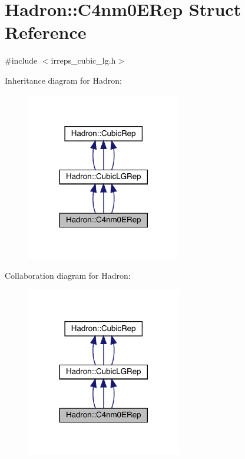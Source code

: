 \hypertarget{structHadron_1_1C4nm0ERep}{}\section{Hadron\+:\+:C4nm0\+E\+Rep Struct Reference}
\label{structHadron_1_1C4nm0ERep}


{\ttfamily \#include $<$irreps\+\_\+cubic\+\_\+lg.\+h$>$}



Inheritance diagram for Hadron\+:
\nopagebreak
\begin{figure}[H]
\begin{center}
\leavevmode
\includegraphics[width=192pt]{d6/d30/structHadron_1_1C4nm0ERep__inherit__graph}
\end{center}
\end{figure}


Collaboration diagram for Hadron\+:
\nopagebreak
\begin{figure}[H]
\begin{center}
\leavevmode
\includegraphics[width=192pt]{d4/d8e/structHadron_1_1C4nm0ERep__coll__graph}
\end{center}
\end{figure}

